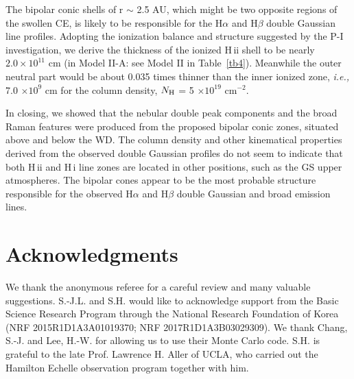 \documentclass[a4paper,fleqn,usenatbib,useAMS]{mnras}
\def\ie{{\it i.e.,} }
\def\ha{H{$\alpha$}}
\def\hb{H{$\beta$}}
\def\hi{H\,{\sc i}}
\def\hii{H\,{\sc ii}}
\begin{document}
{{{{%


The bipolar conic shells of r $\sim$ 2.5 AU, which might be two opposite regions of the swollen CE, is likely to be responsible for the  {\ha} and {\hb} double Gaussian line profiles. Adopting the ionization balance and structure suggested by the P-I investigation, we derive the thickness of the ionized {\hii} shell to be nearly $2.0 \times 10^{11}$ cm (in Model II-A: see Model II in Table~\ref{tb4}). Meanwhile the outer neutral part would be about 0.035 times thinner than the inner ionized zone, \ie 7.0 $\times 10^{9}$ cm for the column density, $N_{\rm H}$ = 5 $\times 10^{19}$ cm$^{-2}$.

In closing, we showed that the nebular double peak components and the broad Raman features were produced from the proposed bipolar conic zones, situated above and below the WD. The column density and other kinematical properties derived from the observed double Gaussian profiles do not seem to indicate that both {\hii} and {\hi} line zones are located in other positions, such as the GS upper atmospheres.  The bipolar cones appear to be the most probable structure responsible for the observed {\ha} and {\hb} double Gaussian and broad emission lines.

\section*{Acknowledgments}

We thank the anonymous referee for a careful review and many valuable suggestions. S.-J.L. and S.H. would like to acknowledge support from the Basic Science Research Program through the National Research Foundation of Korea (NRF 2015R1D1A3A01019370; NRF 2017R1D1A3B03029309).
We thank Chang, S.-J. and Lee, H.-W. for allowing us to use their Monte Carlo code. S.H. is grateful to the late Prof. Lawrence H. Aller of UCLA, who carried out the Hamilton Echelle observation program together with him.

}}}}
\end{document}

